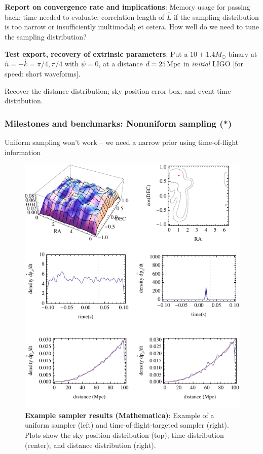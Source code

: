 \documentclass[twocolumn,prd,nofootinbib]{revtex4}
\newcommand\unit[1]{\, {\rm #1}}
\begin{document}
\begin{widetext}
\noindent \textbf{Report on convergence rate and implications}: Memory usage for passing back; time needed to evaluate;
correlation length of $\hat{L}$ if the sampling distribution is too narrow or insufficiently multimodal; et cetera.  How well do we need to tune the sampling distribution?


\noindent \textbf{Test export, recovery of extrinsic parameters}: Put a $10+1.4 M_\odot$ binary  at
$\hat{n}=-\hat{k}=\pi/4,\pi/4$ with $\psi=0$, at a distance $d=25\unit{Mpc}$ in \emph{initial} LIGO [for speed: short
  waveforms].  

Recover the distance distribution;  sky position error box; and event time distribution.


\subsubsection{Milestones and benchmarks: Nonuniform sampling (*)} 
Uniform sampling won't work -- we need a narrow prior using time-of-flight information

\begin{figure}
\includegraphics{Figures/fig-mma-DemoSampler.pdf}
\caption{\label{fig:Milestones:DemoSampler:Mathematica}\textbf{Example sampler results (Mathematica)}: Example of a
  uniform sampler (left) and time-of-flight-targeted sampler (right).  Plots show the sky position distribution (top);
  time distribution (center); and distance distribution (right). 
}
\end{figure}


\end{widetext}
\end{document}
